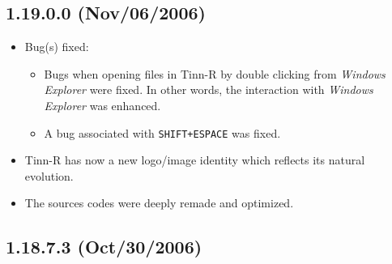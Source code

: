 \subsection{1.19.0.0 (Nov/06/2006)}

\begin{itemize}
  \item Bug(s) fixed:
    \begin{itemize}
      \item Bugs when opening files in Tinn-R by double clicking from
        \textit{Windows Explorer} were fixed. In other words, the
        interaction with \textit{Windows Explorer} was enhanced.
      \item A bug associated with \texttt{SHIFT+ESPACE} was fixed.
    \end{itemize}
  \item Tinn-R has now a new logo/image identity which reflects
    its natural evolution.
  \item The sources codes were deeply remade and optimized.
\end{itemize}


\subsection{1.18.7.3 (Oct/30/2006)}

